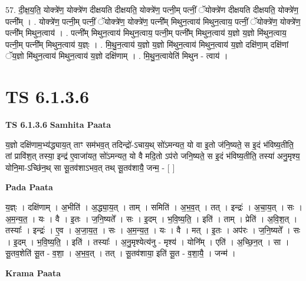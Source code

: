 \documentclass[17pt]{extarticle}
\begin{document}
57. दी॒क्ष॒य॒ति॒ योक्त्रे॑ण॒ योक्त्रे॑ण दीक्षयति दीक्षयति॒ योक्त्रे॑ण॒ पत्नी॒म् पत्नीं॒ ॅयोक्त्रे॑ण दीक्षयति दीक्षयति॒ योक्त्रे॑ण॒ पत्नी᳚म् । . योक्त्रे॑ण॒ पत्नी॒म् पत्नीं॒ ॅयोक्त्रे॑ण॒ योक्त्रे॑ण॒ पत्नी᳚म् मिथुन॒त्वाय॑ मिथुन॒त्वाय॒ पत्नीं॒ ॅयोक्त्रे॑ण॒ योक्त्रे॑ण॒ पत्नी᳚म् मिथुन॒त्वाय॑ । . पत्नी᳚म् मिथुन॒त्वाय॑ मिथुन॒त्वाय॒ पत्नी॒म् पत्नी᳚म् मिथुन॒त्वाय॑ य॒ज्ञो य॒ज्ञो मि॑थुन॒त्वाय॒ पत्नी॒म् पत्नी᳚म् मिथुन॒त्वाय॑ य॒ज्ञ्ः । . मि॒थु॒न॒त्वाय॑ य॒ज्ञो य॒ज्ञो मि॑थुन॒त्वाय॑ मिथुन॒त्वाय॑ य॒ज्ञो दक्षि॑णा॒म् दक्षि॑णां ॅय॒ज्ञो मि॑थुन॒त्वाय॑ मिथुन॒त्वाय॑ य॒ज्ञो दक्षि॑णाम् । . मि॒थु॒न॒त्वायेति॑ मिथुन - त्वाय॑ । \newline
\pagebreak
{}

\section{ TS 6.1.3.6 }

\textbf{TS 6.1.3.6 } \newline
\textbf{Samhita Paata} \newline

य॒ज्ञो दक्षि॑णाम॒भ्य॑द्ध्याय॒त् ताꣳ सम॑भव॒त् तदिन्द्रो॑-ऽचाय॒थ् सो॑ऽमन्यत॒ यो वा इ॒तो ज॑नि॒ष्यते॒ स इ॒दं भ॑विष्य॒तीति॒ तां प्रावि॑श॒त् तस्या॒ इन्द्र॑ ए॒वाजा॑यत॒ सो॑ऽमन्यत॒ यो वै मदि॒तो ऽप॑रो जनि॒ष्यते॒ स इ॒दं भ॑विष्य॒तीति॒ तस्या॑ अनु॒मृश्य॒ योनि॒मा-ऽच्छि॑न॒थ् सा सू॒तव॑शाऽभव॒त् तथ् सू॒तव॑शायै॒ जन्म॒ - [  ] \newline

\textbf{Pada Paata} \newline

य॒ज्ञ्ः । दक्षि॑णाम् । अ॒भीति॑ । अ॒द्ध्या॒य॒त् । ताम् । समिति॑ । अ॒भ॒व॒त् । तत् । इन्द्रः॑ । अ॒चा॒य॒त् । सः । अ॒म॒न्य॒त॒ । यः । वै । इ॒तः । ज॒नि॒ष्यते᳚ । सः । इ॒दम् । भ॒वि॒ष्य॒ति॒ । इति॑ । ताम् । प्रेति॑ । अ॒वि॒श॒त् । तस्याः᳚ । इन्द्रः॑ । ए॒व । अ॒जा॒य॒त॒ । सः । अ॒म॒न्य॒त॒ । यः । वै । मत् । इ॒तः । अप॑रः । ज॒नि॒ष्यते᳚ । सः । इ॒दम् । भ॒वि॒ष्य॒ति॒ । इति॑ । तस्याः᳚ । अ॒नु॒मृश्येत्य॑नु - मृश्य॑ । योनि᳚म् । एति॑ । अ॒च्छि॒न॒त् । सा । सू॒तव॒शेति॑ सू॒त - व॒शा॒ । अ॒भ॒व॒त् । तत् । सू॒तव॑शाया॒ इति॑ सू॒त - व॒शा॒यै॒ । जन्म॑ ।  \newline


\textbf{Krama Paata} \newline
\end{document}

